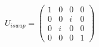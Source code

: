 \documentclass[preview, border={5pt,5pt,5pt,5pt}]{standalone}
\begin{document}
$
U_{iswap} =
\begin{pmatrix}
    1 & 0 & 0 & 0 \\
    0 & 0 & i & 0 \\
    0 & i & 0 & 0 \\
    0 & 0 & 0 & 1
\end{pmatrix}
$
\end{document}
